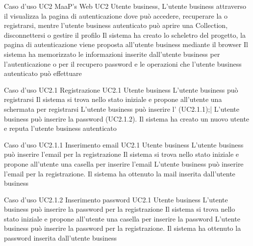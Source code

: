\UCtitle
{Caso d'uso UC2}
{MaaP's Web}
\UC
{UC2}
{Utente business, }
{L'utente business attraverso il  visualizza la pagina di autenticazione dove può accedere, recuperare la  o registrarsi, mentre l'utente business autenticato può aprire una Collection, disconnettersi o gestire il profilo}
{Il sistema ha creato lo scheletro del progetto, la pagina di autenticazione viene proposta all'utente business mediante il browser}
\post
{Il sistema ha memorizzato le informazioni inserite dall'utente business per l'autenticazione o per il recupero password e le operazioni che l'utente business autenticato può effettuare}



\UCtitle
{Caso d'uso UC2.1}
{Registrazione}
\UC
{UC2.1}
{Utente business}
{L'utente business può registrarsi}
{Il sistema si trova nello stato iniziale e propone all'utente una schermata per registrarsi}
\scenario
{
L'utente business può inserire l' (UC2.1.1);|
L'utente business può inserire la password (UC2.1.2).
}
\post
{Il sistema ha creato un nuovo utente e reputa l'utente business autenticato}

\UCtitle
{Caso d'uso UC2.1.1}
{Inserimento email}
\UC
{UC2.1}
{Utente business}
{L'utente business può inserire l'email per la registrazione}
{Il sistema si trova nello stato iniziale e propone all'utente una casella per inserire l'email}
\scenario
{L'utente business può inserire l'email per la registrazione.}
\post
{Il sistema ha ottenuto la mail inserita dall'utente business}

\UCtitle
{Caso d'uso UC2.1.2}
{Inserimento password}
\UC
{UC2.1}
{Utente business}
{L'utente business può inserire la password per la registrazione}
{Il sistema si trova nello stato iniziale e propone all'utente una casella per inserire la password}
\scenario
{L'utente business può inserire la password per la registrazione.}
\post
{Il sistema ha ottenuto la password inserita dall'utente business}

